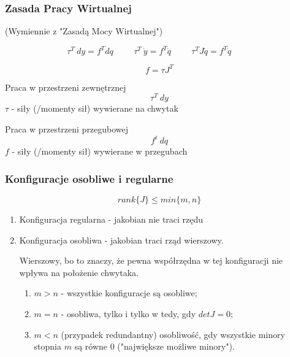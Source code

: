 \documentclass{article}
\newenvironment{kol2}{\noindent \begin{minipage}[t]{0.5\linewidth}}{\end{minipage}}
\begin{document}
\subsubsection{Zasada Pracy Wirtualnej}
(Wymiennie z "Zasadą Mocy Wirtualnej")

$$  \tau^T\ dy = f^T dq                 \hspace{1cm}
    \tau^T\ \dot{y} = f^T \dot{q}       \hspace{1cm}
    \tau^T J \dot{q} = f^T \dot{q}      \hspace{1cm}
$$

\Large
$$ f = \tau J^T $$
\normalsize

\begin{kol2}
    Praca w przestrzeni zewnętrznej
    $$ \tau^T\ dy $$
    $\tau$ - siły (/momenty sił) wywierane na chwytak
\end{kol2}
\begin{kol2}
    Praca w przestrzeni przegubowej
    $$ f^t\ dq$$
    $f$ - siły (/momenty sił) wywierane w przegubach
\end{kol2}

\subsubsection{Konfiguracje osobliwe i regularne}

$$ rank\{J\} \leq min\{ m, n \} $$

\begin{enumerate}
    \item Konfiguracja regularna - jakobian nie traci rzędu
    \item Konfiguracja osobliwa - jakobian traci rząd wierszowy.

          Wierszowy, bo to znaczy, że pewna współrzędna w tej konfiguracji nie wpływa na położenie chwytaka.

          \begin{enumerate}
              \item $m > n$ - wszystkie konfiguracje są osobliwe;
              \item $m = n$ - osobliwa, tylko i tylko w tedy, gdy $ det{J} = 0$;
              \item $m < n$ (przypadek redundantny) osobliwość,
                    gdy wszystkie minory stopnia $m$ są równe $0$ ("największe możliwe minory").
          \end{enumerate}

\end{enumerate}
\end{document}
